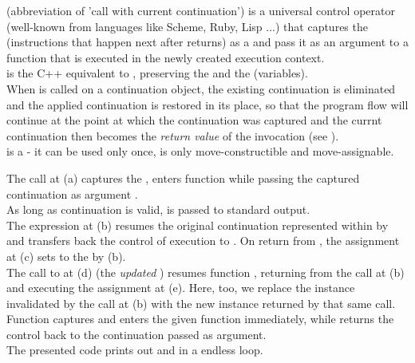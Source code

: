 
\cc (abbreviation of 'call with current continuation') is a universal control
operator (well-known from languages like Scheme, Ruby, Lisp ...) that captures
the \currcont (instructions that happen next after \cc returns) as a
 and pass it as an argument to a function that is
executed in the newly created execution context.\\

\call is the C++ equivalent to \cc, preserving the  and the
 (variables).\\

When \op is called on a continuation object, the existing continuation is
eliminated and the applied continuation is restored in its place, so that the
program flow will continue at the point at which the continuation was captured
and the currnt continuation then becomes the \emph{return value} of the \call
invocation (see ).\\

\cont is a  - it can be used only once, is only
move-constructible and move-assignable.

The  call at (a) captures the \currcont, enters function
 while passing the captured continuation as argument .\\
As long as continuation  is valid,  is passed to standard
output.\\
The expression  at (b) resumes the original
continuation represented within  by  and transfers back the
control of execution to . On return from ,
the assignment at (c) sets  to the \currcont by (b).\\
The call to  at (d) (the \emph{updated} )
resumes function , returning from the \op call at (b) and executing
the assignment at (e). Here, too, we replace the \cont instance 
invalidated by the \op call at (b) with the new instance returned by that
same \op call.\\
Function \call captures \currcont and enters the given function immediately,
while \op returns the control back to the continuation passed as argument.\\
The presented code prints out  and  in a endless loop.\\

